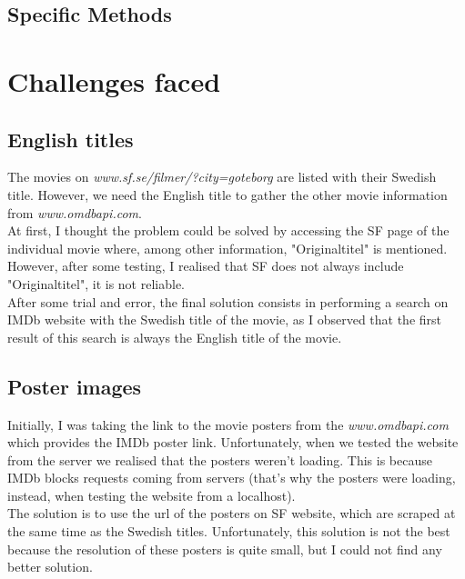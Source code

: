 \documentclass{article}
\begin{document}
\subsection{Specific Methods}


\section{Challenges faced}
\subsection{English titles}
The movies on \textit{www.sf.se/filmer/?city=goteborg} are listed with their Swedish title. However, we need the English title to gather the other movie information from \textit{www.omdbapi.com}.\\
At first, I thought the problem could be solved by accessing the SF page of the individual movie where, among other information, "Originaltitel" is mentioned. However, after some testing, I realised that SF does not always include "Originaltitel", it is not reliable.\\
After some trial and error, the final solution consists in performing a search on IMDb website with the Swedish title of the movie, as I observed that the first result of this search is always the English title of the movie.

\subsection{Poster images}
Initially, I was taking the link to the movie posters from the \textit{www.omdbapi.com} which provides the IMDb poster link. Unfortunately, when we tested the website from the server we realised that the posters weren't loading. This is because IMDb blocks requests coming from servers (that's why the posters were loading, instead, when testing the website from a localhost).\\
The solution is to use the url of the posters on SF website, which are scraped at the same time as the Swedish titles. Unfortunately, this solution is not the best because the resolution of these posters is quite small, but I could not find any better solution.

\end{document}
